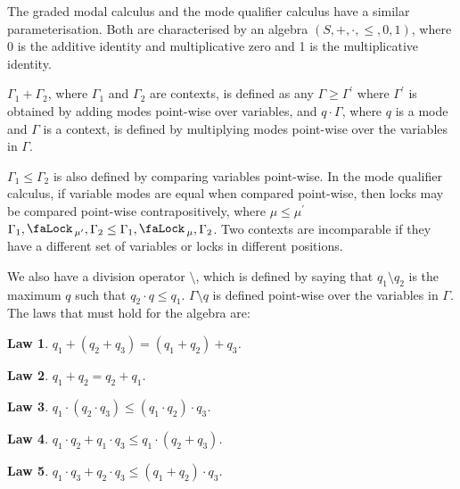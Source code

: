 \documentclass[acmsmall,screen,nonacm]{acmart}
\DeclareMathOperator{\lock}{\tikz{\node[scale=1, line width=0pt, inner sep=0pt] at (0,0) {\faLock\,};}}
\newtheorem{law}{Law}
\begin{document}
The graded modal calculus and the mode qualifier calculus have a similar parameterisation. Both are characterised by an algebra $(S, +, \cdot, \le, 0, 1)$, where 0 is the additive identity and multiplicative zero and 1 is the multiplicative identity. 

$\Gamma_1 + \Gamma_2$, where $\Gamma_1$ and $\Gamma_2$ are contexts, is defined as any $\Gamma \ge \Gamma^\prime$ where $\Gamma^\prime$ is obtained by adding modes point-wise over variables, and $q \cdot \Gamma$, where $q$ is a mode and $\Gamma$ is a context, is defined by multiplying modes point-wise over the variables in $\Gamma$.

$\Gamma_1 \le \Gamma_2$ is also defined by comparing variables point-wise. In the mode qualifier calculus, if variable modes are equal when compared point-wise, then locks may be compared point-wise contrapositively, where $\mu \le \mu^\prime$ $\Gamma_1, \lock_{\mu^\prime}, \Gamma_2 \le \Gamma_1, \lock_\mu, \Gamma_2$. Two contexts are incomparable if they have a different set of variables or locks in different positions.

We also have a division operator $\setminus$, which is defined by saying that $q_1 \setminus q_2$ is the maximum $q$ such that $q_2 \cdot q \le q_1$. $\Gamma \setminus q$ is defined point-wise over the variables in $\Gamma$.
\\

The laws that must hold for the algebra are:

\begin{law}
\label{law:add-assoc}
  $q_1 + (q_2 + q_3) = (q_1 + q_2) + q_3$.
\end{law}

\begin{law}
\label{law:add-comm}
  $q_1 + q_2 = q_2 + q_1$.
\end{law}

\begin{law}
\label{law:mul-assoc-1}
  $q_1 \cdot (q_2 \cdot q_3) \le (q_1 \cdot q_2) \cdot q_3$.
\end{law}

\begin{law}
\label{law:mul-distr-add-left-1}
  $q_1 \cdot q_2 + q_1 \cdot q_3 \le q_1 \cdot (q_2 + q_3)$.
\end{law}

\begin{law}
\label{law:mul-distr-add-right-1}
  $q_1 \cdot q_3 + q_2 \cdot q_3 \le (q_1 + q_2) \cdot q_3$.
\end{law}
\end{document}

